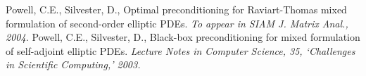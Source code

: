 \documentclass{report}
\begin{document}
\begin{thebibliography}{10}
 Powell, C.E., Silvester, D., Optimal preconditioning for
Raviart-Thomas mixed formulation of second-order elliptic PDEs.
\textit{To appear in SIAM J. Matrix Anal., 2004.}
Powell, C.E., Silvester, D., Black-box preconditioning for
mixed formulation of self-adjoint elliptic PDEs. \textit{Lecture Notes in
Computer Science, 35, `Challenges in Scientific Computing,' 2003.}
\end{thebibliography}
\end{document}
